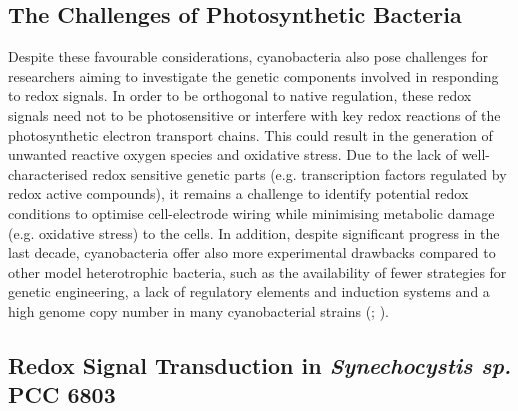 \subsection{The Challenges of Photosynthetic Bacteria}
Despite these favourable considerations, cyanobacteria also pose challenges for researchers aiming to investigate the genetic components involved in responding to redox signals. In order to be orthogonal to native regulation, these redox signals need not to be photosensitive or interfere with key redox reactions of the photosynthetic electron transport chains. This could result in the generation of unwanted reactive oxygen species and oxidative stress.
Due to the lack of well-characterised redox sensitive genetic parts (e.g. transcription factors regulated by redox active compounds), it remains a challenge to identify potential redox conditions to optimise cell-electrode wiring while minimising metabolic damage (e.g. oxidative stress) to the cells. 
In addition, despite significant progress in the last decade, cyanobacteria offer also more experimental drawbacks compared to other model heterotrophic bacteria, such as the availability of fewer strategies for genetic engineering, a lack of regulatory elements and induction systems and a high genome copy number in many cyanobacterial strains (\citealt{Huang2010}; \citealt{Till2020}).


\subsection{Redox Signal Transduction in \textit{Synechocystis sp.} PCC 6803}

